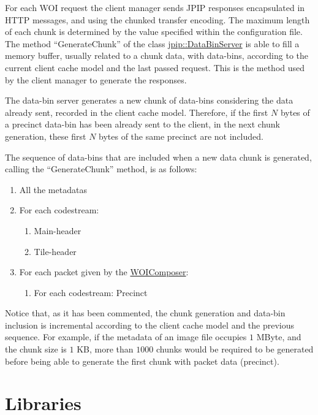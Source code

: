 For each WOI request the client manager sends JPIP responses encapsulated in
HTTP messages, and using the chunked transfer encoding. The maximum length
of each chunk is determined by the value specified within the configuration
file. The method  ``GenerateChunk'' of the class \hyperlink{classjpip_1_1DataBinServer}
{jpip::DataBinServer} is able to fill a memory buffer, usually related to
a chunk data, with data-bins, according to the current client cache model and
the last passed request. This is the method used by the client manager to
generate the responses.

The data-bin server generates a new chunk of data-bins considering the data
already sent, recorded in the client cache model. Therefore, if the first
$N$ bytes of a precinct data-bin has been already sent to the client, in
the next chunk generation, these first $N$ bytes of the same precinct are
not included.

The sequence of data-bins that are included when a new data chunk is generated,
calling the ``GenerateChunk'' method, is as follows:

\begin{enumerate}

\item All the metadatas

\item For each codestream:
	\begin{enumerate}
	\item Main-header
	\item Tile-header
	\end{enumerate}

\item For each packet given by the \hyperlink{classjpip_1_1WOIComposer}{WOIComposer}:
	\begin{enumerate}
	\item For each codestream: Precinct
	\end{enumerate}

\end{enumerate}

Notice that, as it has been commented, the chunk generation and data-bin
inclusion is incremental according to the client cache model and the previous
sequence. For example, if
the metadata of an image file occupies $1$ MByte, and the chunk size is $1$ KB,
more than $1000$ chunks would be required to be generated before being able to
generate the first chunk with packet data (precinct). 

\section{Libraries}
\label{libraries}


